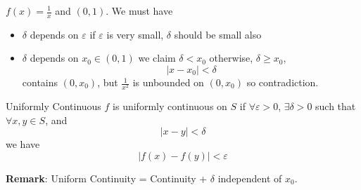 \documentclass{report}
\begin{document}
\begin{examples}
    \begin{example}
        $f(x) = \frac{1}{x}$ and $(0, 1)$. We must have
            \begin{itemize}
                \item  $\delta$ depends on $\varepsilon$ if $\varepsilon$ is very small, $\delta$ should be small also

                \item $\delta$ depends on $x_{0} \in (0, 1)$ we claim $\delta< x_{0}$ otherwise, $\delta \geq x_{0}$,
                    \begin{equation*}
                        \lvert  x - x_{0} \rvert < \delta
                    \end{equation*}
                contains $(0, x_{0})$, but $\frac{1}{x^{2}}$ is unbounded on $(0, x_{0})$ so contradiction.
            \end{itemize}
    \end{example}
\end{examples}

\begin{definition}{Uniformly Continuous}
    $f$ is uniformly continuous on $S$ if $\forall \varepsilon> 0$, $\exists \delta > 0$ such that $\forall x, y \in S$, and 
        \begin{equation*}
            \lvert x - y \rvert < \delta
        \end{equation*}
    we have
        \begin{equation*}
            \lvert f(x) - f(y) \rvert < \varepsilon
        \end{equation*}
\end{definition}

\textbf{Remark}: Uniform Continuity = Continuity + $\delta$ independent of $x_{0}$.
\end{document}
